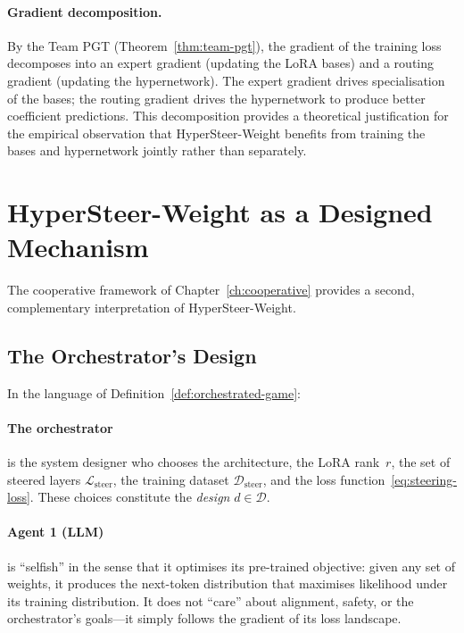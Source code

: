 \paragraph{Gradient decomposition.} By the Team PGT (Theorem~\ref{thm:team-pgt}), the gradient of the training loss decomposes into an expert gradient (updating the LoRA bases) and a routing gradient (updating the hypernetwork). The expert gradient drives specialisation of the bases; the routing gradient drives the hypernetwork to produce better coefficient predictions. This decomposition provides a theoretical justification for the empirical observation that HyperSteer-Weight benefits from training the bases and hypernetwork jointly rather than separately.

\section{HyperSteer-Weight as a Designed Mechanism}
\label{sec:hsw-as-mechanism}

The cooperative framework of Chapter~\ref{ch:cooperative} provides a second, complementary interpretation of HyperSteer-Weight.

\subsection{The Orchestrator's Design}
\label{subsec:orchestrator-design}

In the language of Definition~\ref{def:orchestrated-game}:

\paragraph{The orchestrator} is the system designer who chooses the architecture, the LoRA rank~$r$, the set of steered layers $\mathcal{L}_{\mathrm{steer}}$, the training dataset $\mathcal{D}_{\mathrm{steer}}$, and the loss function~\eqref{eq:steering-loss}. These choices constitute the \emph{design} $d\in\mathcal{D}$.

\paragraph{Agent 1 (LLM)} is ``selfish'' in the sense that it optimises its pre-trained objective: given any set of weights, it produces the next-token distribution that maximises likelihood under its training distribution. It does not ``care'' about alignment, safety, or the orchestrator's goals---it simply follows the gradient of its loss landscape.

